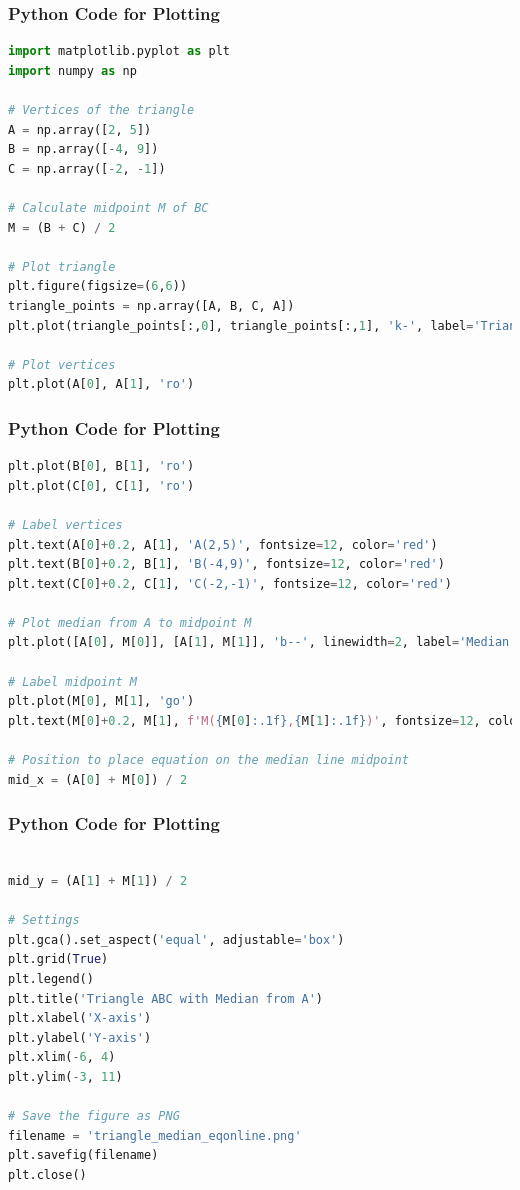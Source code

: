 \documentclass{beamer}
\numberwithin{equation}{section}
\begin{document}
\begin{frame}[fragile]
\frametitle{Python Code for Plotting}
\begin{lstlisting}[language=Python]
import matplotlib.pyplot as plt
import numpy as np

# Vertices of the triangle
A = np.array([2, 5])
B = np.array([-4, 9])
C = np.array([-2, -1])

# Calculate midpoint M of BC
M = (B + C) / 2

# Plot triangle
plt.figure(figsize=(6,6))
triangle_points = np.array([A, B, C, A])
plt.plot(triangle_points[:,0], triangle_points[:,1], 'k-', label='Triangle ABC')

# Plot vertices
plt.plot(A[0], A[1], 'ro')

\end{lstlisting}

\end{frame}
\begin{frame}[fragile]
\frametitle{Python Code for Plotting}
\begin{lstlisting}[language=Python]
plt.plot(B[0], B[1], 'ro')
plt.plot(C[0], C[1], 'ro')

# Label vertices
plt.text(A[0]+0.2, A[1], 'A(2,5)', fontsize=12, color='red')
plt.text(B[0]+0.2, B[1], 'B(-4,9)', fontsize=12, color='red')
plt.text(C[0]+0.2, C[1], 'C(-2,-1)', fontsize=12, color='red')

# Plot median from A to midpoint M
plt.plot([A[0], M[0]], [A[1], M[1]], 'b--', linewidth=2, label='Median AM')

# Label midpoint M
plt.plot(M[0], M[1], 'go')
plt.text(M[0]+0.2, M[1], f'M({M[0]:.1f},{M[1]:.1f})', fontsize=12, color='green')

# Position to place equation on the median line midpoint
mid_x = (A[0] + M[0]) / 2

\end{lstlisting}

\end{frame}
\begin{frame}[fragile]
\frametitle{Python Code for Plotting}
\begin{lstlisting}[language=Python]

mid_y = (A[1] + M[1]) / 2

# Settings
plt.gca().set_aspect('equal', adjustable='box')
plt.grid(True)
plt.legend()
plt.title('Triangle ABC with Median from A')
plt.xlabel('X-axis')
plt.ylabel('Y-axis')
plt.xlim(-6, 4)
plt.ylim(-3, 11)

# Save the figure as PNG
filename = 'triangle_median_eqonline.png'
plt.savefig(filename)
plt.close()
\end{lstlisting}

\end{frame}
\end{document}

